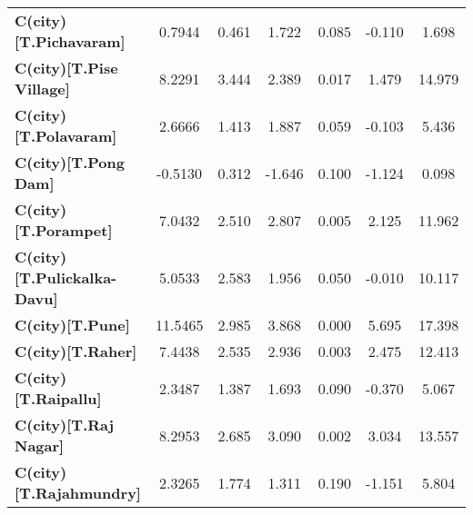 \begin{center}
\begin{tabular}{lcccccc}
\textbf{C(city)[T.Pichavaram]}                                                                      &       0.7944  &        0.461     &     1.722  &         0.085        &       -0.110    &        1.698     \\
\textbf{C(city)[T.Pise Village]}                                                                    &       8.2291  &        3.444     &     2.389  &         0.017        &        1.479    &       14.979     \\
\textbf{C(city)[T.Polavaram]}                                                                       &       2.6666  &        1.413     &     1.887  &         0.059        &       -0.103    &        5.436     \\
\textbf{C(city)[T.Pong Dam]}                                                                        &      -0.5130  &        0.312     &    -1.646  &         0.100        &       -1.124    &        0.098     \\
\textbf{C(city)[T.Porampet]}                                                                        &       7.0432  &        2.510     &     2.807  &         0.005        &        2.125    &       11.962     \\
\textbf{C(city)[T.Pulickalka-Davu]}                                                                 &       5.0533  &        2.583     &     1.956  &         0.050        &       -0.010    &       10.117     \\
\textbf{C(city)[T.Pune]}                                                                            &      11.5465  &        2.985     &     3.868  &         0.000        &        5.695    &       17.398     \\
\textbf{C(city)[T.Raher]}                                                                           &       7.4438  &        2.535     &     2.936  &         0.003        &        2.475    &       12.413     \\
\textbf{C(city)[T.Raipallu]}                                                                        &       2.3487  &        1.387     &     1.693  &         0.090        &       -0.370    &        5.067     \\
\textbf{C(city)[T.Raj Nagar]}                                                                       &       8.2953  &        2.685     &     3.090  &         0.002        &        3.034    &       13.557     \\
\textbf{C(city)[T.Rajahmundry]}                                                                     &       2.3265  &        1.774     &     1.311  &         0.190        &       -1.151    &        5.804     \\

\end{tabular}
\end{center}
